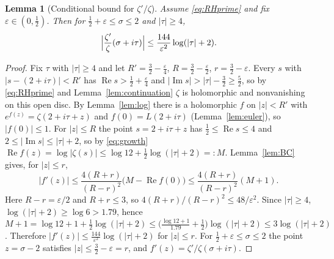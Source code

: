 \documentclass[11pt]{article}
\newtheorem{lemma}[theorem]{Lemma}
\theoremstyle{definition}
\newcommand{\re}{\operatorname{Re}}
\newcommand{\im}{\operatorname{Im}}
\begin{document}
\begin{lemma}[Conditional bound for $\zeta'/\zeta$]\label{lem:cond-bound}
Assume \eqref{eq:RHprime} and fix $\varepsilon\in(0,\tfrac12)$. Then for $\tfrac12+\varepsilon\le\sigma\le2$ and $|\tau|\ge4$,
\[
\Bigl|\frac{\zeta'}{\zeta}(\sigma+i\tau)\Bigr|\le\frac{144}{\varepsilon^{2}}\log(|\tau|+2).
\]
\end{lemma}
\begin{proof}
Fix $\tau$ with $|\tau|\ge4$ and let $R'=\tfrac32-\tfrac\varepsilon4$, $R=\tfrac32-\tfrac\varepsilon2$, $r=\tfrac32-\varepsilon$.
Every $s$ with $|s-(2+i\tau)|<R'$ has $\re s>\tfrac12+\tfrac\varepsilon4$ and $|\im s|>|\tau|-\tfrac32\ge\tfrac52$, so by \eqref{eq:RHprime} and Lemma~\ref{lem:continuation} $\zeta$ is holomorphic and nonvanishing on this open disc.
By Lemma~\ref{lem:log} there is a holomorphic $f$ on $|z|<R'$ with $e^{f(z)}=\zeta(2+i\tau+z)$ and $f(0)=L(2+i\tau)$ (Lemma~\ref{lem:euler}), so $|f(0)|\le1$.
For $|z|\le R$ the point $s=2+i\tau+z$ has $\tfrac12\le\re s\le4$ and $2\le|\im s|\le|\tau|+2$, so by \eqref{eq:growth}
$\re f(z)=\log|\zeta(s)|\le\log12+\tfrac12\log(|\tau|+2)=:M$.
Lemma~\ref{lem:BC} gives, for $|z|\le r$,
\[
|f'(z)|\le\frac{4(R+r)}{(R-r)^{2}}\bigl(M-\re f(0)\bigr)\le\frac{4(R+r)}{(R-r)^{2}}(M+1).
\]
Here $R-r=\varepsilon/2$ and $R+r\le3$, so $4(R+r)/(R-r)^{2}\le48/\varepsilon^{2}$.
Since $|\tau|\ge4$, $\log(|\tau|+2)\ge\log6>1.79$, hence
$M+1=\log12+1+\tfrac12\log(|\tau|+2)\le\bigl(\tfrac{\log 12+1}{1.79}+\tfrac12\bigr)\log(|\tau|+2)\le3\log(|\tau|+2)$.
Therefore $|f'(z)|\le\frac{144}{\varepsilon^{2}}\log(|\tau|+2)$ for $|z|\le r$.
For $\tfrac12+\varepsilon\le\sigma\le2$ the point $z=\sigma-2$ satisfies $|z|\le\tfrac32-\varepsilon=r$, and $f'(z)=\zeta'/\zeta(\sigma+i\tau)$.
\end{proof}
\end{document}
